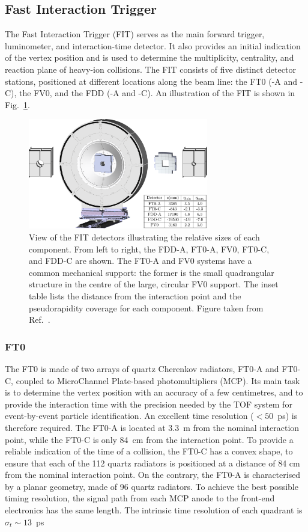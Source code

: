 \subsection{Fast Interaction Trigger}\label{subsec:FIT}
The Fast Interaction Trigger (FIT) serves as the main forward trigger, luminometer, and interaction-time detector. It also provides an initial indication of the vertex position and is used to determine the multiplicity, centrality, and reaction plane of heavy-ion collisions. The FIT consists of five distinct detector stations, positioned at different locations along the beam line: the FT0 (-A and -C), the FV0, and the FDD (-A and -C). An illustration of the FIT is shown in Fig.~\ref{fig:FIT}.

\begin{figure}[htb]
    \centering
    \includegraphics[width=0.7\textwidth]{Figures/Chapter 3/FIT_Scheme.png}
    \caption{View of the FIT detectors illustrating the relative sizes of each component. From left to right, the FDD-A, FT0-A, FV0, FT0-C, and FDD-C are shown. The FT0-A and FV0 systems have a common mechanical support: the former is the small quadrangular structure in the centre of the large, circular FV0 support. The inset table lists the distance from the interaction point and the pseudorapidity coverage for each component. Figure taken from Ref.~\cite{ALICE:2023udb}.}
    \label{fig:FIT}
\end{figure}

\subsubsection{FT0}

The FT0 is made of two arrays of quartz Cherenkov radiators, FT0-A and FT0-C, coupled to MicroChannel Plate-based photomultipliers (MCP). Its main task is to determine the vertex position with an accuracy of a few centimetres, and to provide the interaction time with the precision needed by the TOF system for event-by-event particle identification. An excellent time resolution ($<50$~ps) is therefore required. The FT0-A is located at 3.3~m from the nominal interaction point, while the FT0-C is only 84~cm from the interaction point. To provide a reliable indication of the time of a collision, the FT0-C has a convex shape, to ensure that each of the 112 quartz radiators is positioned at a distance of 84 cm from the nominal interaction point. On the contrary, the FT0-A is characterised by a planar geometry, made of 96 quartz radiators. To achieve the best possible timing resolution, the signal path from each MCP anode to the front-end electronics has the same length. The intrinsic time resolution of each quadrant is $\sigma_t \sim 13$~ps

